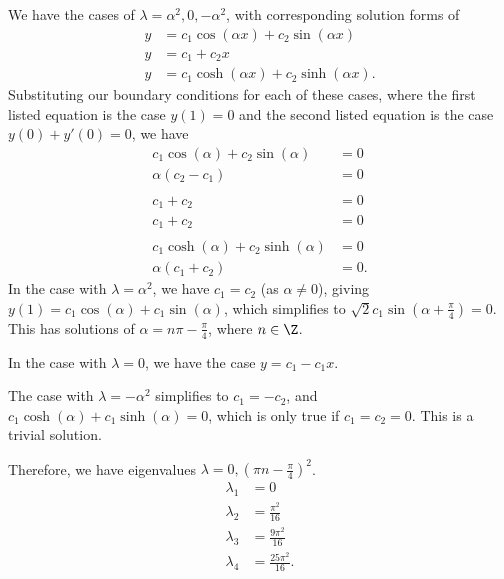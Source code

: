 \documentclass[10pt]{mypackage}
\begin{document}
\begin{solution}[11.4, Problem 2]
  We have the cases of $\lambda = \alpha^2,0,-\alpha^2$, with corresponding solution forms of
  \begin{align*}
    y &= c_1\cos\left( \alpha x \right) + c_2\sin\left( \alpha x \right)\\
    y &= c_1 + c_2 x\\
    y &= c_1\cosh\left( \alpha x \right) + c_2\sinh\left( \alpha x \right).
  \end{align*}
  Substituting our boundary conditions for each of these cases, where the first listed equation is the case $y(1) = 0$ and the second listed equation is the case $y(0) + y'(0) = 0$, we have
  \begin{align*}
    c_1\cos\left( \alpha \right) + c_2\sin\left( \alpha \right) &= 0\\
    \alpha\left( c_2-c_1 \right) &= 0\\
    \\
    c_1 + c_2 &= 0\\
    c_1 + c_2 &= 0\\
    \\
    c_1\cosh\left( \alpha \right) + c_2\sinh\left( \alpha \right) &= 0\\
    \alpha\left( c_1 + c_2 \right) &= 0.
  \end{align*}
  In the case with $\lambda = \alpha^2$, we have $c_1 = c_2$ (as $\alpha\neq 0$), giving $y(1) = c_1\cos\left( \alpha \right) + c_1\sin\left( \alpha \right)$, which simplifies to $\sqrt{2}c_1\sin\left( \alpha + \frac{\pi}{4} \right) = 0$. This has solutions of $\alpha = n\pi - \frac{\pi}{4}$, where $n\in\Z$.\newline

  In the case with $\lambda = 0$, we have the case $y = c_1 - c_1 x$.\newline

  The case with $\lambda = -\alpha^2$ simplifies to $c_1 = -c_2$, and $c_1\cosh\left( \alpha \right) + c_1\sinh\left( \alpha \right) = 0$, which is only true if $c_1 = c_2 = 0$. This is a trivial solution.\newline

  Therefore, we have eigenvalues $\lambda = 0,\left( \pi n - \frac{\pi}{4} \right)^2$. 
  \begin{align*}
    \lambda_1 &= 0\\
    \lambda_2 &= \frac{\pi^2}{16}\\
    \lambda_3 &= \frac{9\pi^2}{16}\\
    \lambda_4 &= \frac{25\pi^2}{16}.
  \end{align*}
\end{solution}
\end{document}
